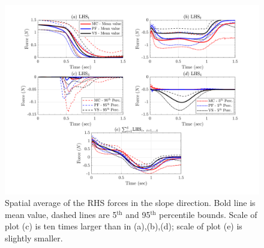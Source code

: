 \documentclass{article}
\begin{document}
\begin{figure}[H]
        \centering
        \includegraphics[width=1\textwidth]{InclinedPlane/AveragedMeasurments/ForcesIncline.png}
        \caption{Spatial average of the RHS forces in the slope direction. Bold line is mean value, dashed lines are 5$^{\mathrm{th}}$ and 95$^{\mathrm{th}}$ percentile bounds. Scale of plot (c) is ten times larger than in (a),(b),(d); scale of plot (e) is slightly smaller.}
        \label{fig:Ramp-Fx-spatial}
\end{figure}
\end{document}
